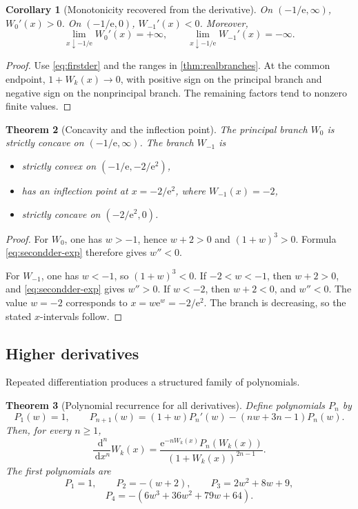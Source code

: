 \documentclass[11pt]{article}
\newtheorem{theorem}{Theorem}[section]
\newtheorem{corollary}[theorem]{Corollary}
\theoremstyle{remark}
\newcommand{\Wz}{W_0}
\newcommand{\Wm}{W_{-1}}
\newcommand{\ee}{\mathrm e}
\newcommand{\dd}{\,\mathrm d}
\begin{document}
\begin{corollary}[Monotonicity recovered from the derivative]
On \((-1/\ee,\infty)\), \(\Wz'(x)>0\).  On
\((-1/\ee,0)\), \(\Wm'(x)<0\).  Moreover,
\[
 \lim_{x\downarrow-1/\ee}\Wz'(x)=+\infty,\qquad
 \lim_{x\downarrow-1/\ee}\Wm'(x)=-\infty.
\]
\end{corollary}

\begin{proof}
Use \eqref{eq:firstder} and the ranges in
\cref{thm:realbranches}.  At the common endpoint, \(1+W_k(x)\to0\), with
positive sign on the principal branch and negative sign on the
nonprincipal branch.  The remaining factors tend to nonzero finite values.
\end{proof}

\begin{theorem}[Concavity and the inflection point]\label{thm:curvature}
The principal branch \(\Wz\) is strictly concave on
\((-1/\ee,\infty)\).  The branch \(\Wm\) is
\begin{itemize}
\item strictly convex on \((-1/\ee,-2/\ee^2)\),
\item has an inflection point at \(x=-2/\ee^2\), where \(\Wm(x)=-2\),
\item strictly concave on \((-2/\ee^2,0)\).
\end{itemize}
\end{theorem}

\begin{proof}
For \(\Wz\), one has \(w>-1\), hence \(w+2>0\) and
\((1+w)^3>0\).  Formula \eqref{eq:secondder-exp} therefore gives \(w''<0\).

For \(\Wm\), one has \(w<-1\), so \((1+w)^3<0\).  If \(-2<w<-1\), then
\(w+2>0\), and \eqref{eq:secondder-exp} gives \(w''>0\).  If \(w<-2\),
then \(w+2<0\), and \(w''<0\).  The value \(w=-2\) corresponds to
\(x=w\ee^w=-2/\ee^2\).  The branch is decreasing, so the stated
\(x\)-intervals follow.
\end{proof}

\subsection{Higher derivatives}

Repeated differentiation produces a structured family of polynomials.

\begin{theorem}[Polynomial recurrence for all derivatives]\label{thm:higherder}
Define polynomials \(P_n\) by
\[
 P_1(w)=1,\qquad
 P_{n+1}(w)=(1+w)P_n'(w)-(nw+3n-1)P_n(w).
\]
Then, for every \(n\geq1\),
\begin{equation}\label{eq:higherder}
 \frac{\dd^n}{\dd x^n}W_k(x)
 =\frac{\ee^{-nW_k(x)}P_n(W_k(x))}
        {(1+W_k(x))^{2n-1}}.
\end{equation}
The first polynomials are
\[
 P_1=1,\qquad P_2=-(w+2),\qquad
 P_3=2w^2+8w+9,
\]
\[
 P_4=-(6w^3+36w^2+79w+64).
\]
\end{theorem}
\end{document}
